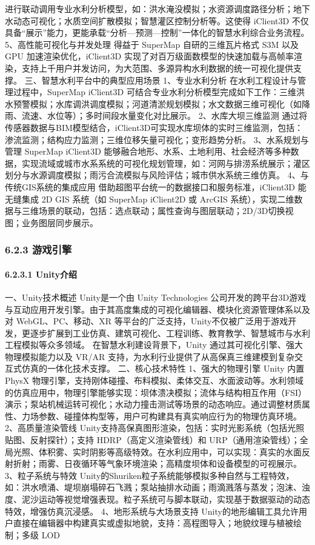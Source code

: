 进行联动调用专业水利分析模型，如：洪水淹没模拟；水资源调度路径分析；地下水动态可视化；水质空间扩散模拟；智慧灌区控制分析等。这使得 iClient3D 不仅具备``展示''能力，更能承载``分析---预测---控制''一体化的智慧水利综合业务流程。 5、高性能可视化与并发处理 得益于 SuperMap 自研的三维瓦片格式 S3M 以及 GPU 加速渲染优化，iClient3D 实现了对百万级面数模型的快速加载与高帧率渲染，支持上千用户并发访问，为大范围、多源异构水利数据的统一可视化提供支撑。 三、智慧水利平台中的典型应用场景 1、专业水利分析 在水利工程设计与管理过程中，SuperMap iClient3D 可结合专业水利分析模型完成如下工作：三维洪水预警模拟；水库调洪调度模拟；河道清淤规划模拟；水文数据三维可视化（如降雨、流速、水位等）；多时间段水量变化对比展示。 2、水库大坝三维监测 通过将传感器数据与BIM模型结合，iClient3D可实现水库坝体的实时三维监测，包括：渗流监测；结构应力监测；三维位移矢量可视化；变形趋势分析。 3、水系规划与管理 SuperMap iClient3D 能够融合地形、水系、土地利用、社会经济等多种数据，实现流域或城市水系系统的可视化规划管理，如：河网与排涝系统展示；灌区划分与水源调度模拟；雨污合流模拟与风险评估；城市供水系统三维仿真。 4、与传统GIS系统的集成应用 借助超图平台统一的数据接口和服务标准，iClient3D 能无缝集成 2D GIS 系统（如 SuperMap iClient2D 或 ArcGIS 系统），实现二维数据与三维场景的联动，包括：选点联动；属性查询与图层联动；2D/3D切换视图；业务图层同步展示。 \subsubsection{6.2.3 游戏引擎}\label{ux6e38ux620fux5f15ux64ce} \paragraph{6.2.3.1 Unity介绍}\label{unityux4ecbux7ecd} 一、Unity技术概述 Unity是一个由 Unity Technologies 公司开发的跨平台3D游戏与互动应用开发引擎。由于其高度集成的可视化编辑器、模块化资源管理体系以及对 WebGL、PC、移动、XR 等平台的广泛支持，Unity不仅被广泛用于游戏开发，更逐步扩展到工业仿真、建筑可视化、工程训练、教育教学、智慧城市与水利工程模拟等众多领域。 在智慧水利建设背景下，Unity 通过其可视化引擎、强大物理模拟能力以及 VR/AR 支持，为水利行业提供了从高保真三维建模到复杂交互式仿真的一体化技术支撑。 二、核心技术特性 1、强大的物理引擎 Unity 内置PhysX 物理引擎，支持刚体碰撞、布料模拟、柔体交互、水面波动等。水利领域的仿真应用中，物理引擎能够实现：坝体溃决模拟；流体与结构相互作用（FSI）演示；泵站机械运转可视化；水动力撞击测试等场景的动态响应。通过调整材质属性、力场参数、碰撞体构型等，用户可构建具有真实响应行为的物理仿真环境。 2、高质量渲染管线 Unity支持高保真图形渲染，包括：实时光影系统（包括光照贴图、反射探针）；支持 HDRP（高定义渲染管线）和 URP（通用渲染管线）；全局光照、体积雾、实时阴影等高级特效。在水利应用中，可以实现：真实的水面反射折射；雨雾、日夜循环等气象环境渲染；高精度坝体和设备模型的可视展示。 3、粒子系统与特效 Unity的Shuriken粒子系统能够模拟多种自然与工程特效，如：洪水喷涌、堤坝崩塌碎石飞溅；泵站抽排水动画；雨滴溅落与蒸发；泡沫、浊度、泥沙运动等视觉增强表现。粒子系统可与脚本联动，实现基于数据驱动的动态特效，增强仿真沉浸感。 4、地形系统与大场景支持 Unity的地形编辑工具允许用户直接在编辑器中构建真实或虚拟地貌，支持：高程图导入；地貌纹理与植被绘制；多级 LOD 